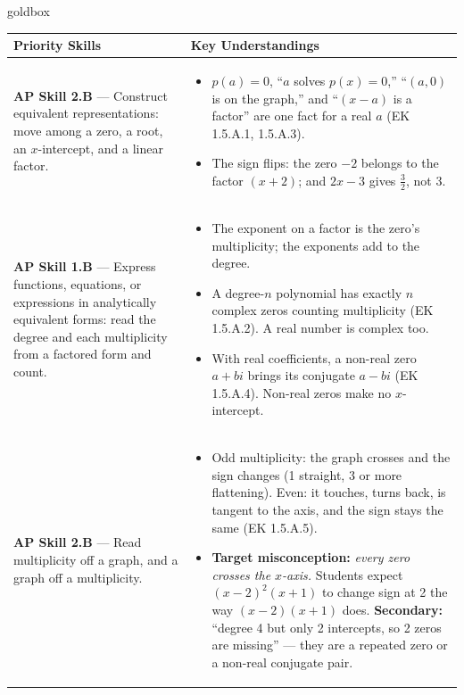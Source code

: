 \documentclass[10pt]{article}
\begin{document}
\renewcommand{\arraystretch}{1.6}
\begin{skillbox}{goldbox}
\begin{tabularx}{\linewidth}{@{}X X@{}}
\textbf{Priority Skills} &
\textbf{Key Understandings} \\
\midrule
\textbf{AP Skill 2.B} --- Construct equivalent representations: move among a zero, a root, an
$x$-intercept, and a linear factor. &
\begin{itemize}[leftmargin=1.2em,itemsep=2pt,topsep=0pt]
  \item $p(a) = 0$, ``$a$ solves $p(x) = 0$,'' ``$(a, 0)$ is on the graph,'' and ``$(x - a)$
        is a factor'' are one fact for a real $a$ (EK 1.5.A.1, 1.5.A.3).
  \item The sign flips: the zero $-2$ belongs to the factor $(x + 2)$; and $2x - 3$ gives
        $\tfrac{3}{2}$, not 3.
\end{itemize} \\
\textbf{AP Skill 1.B} --- Express functions, equations, or expressions in analytically
equivalent forms: read the degree and each multiplicity from a factored form and count. &
\begin{itemize}[leftmargin=1.2em,itemsep=2pt,topsep=0pt]
  \item The exponent on a factor is the zero's multiplicity; the exponents add to the degree.
  \item A degree-$n$ polynomial has exactly $n$ complex zeros counting multiplicity (EK
        1.5.A.2). A real number is complex too.
  \item With real coefficients, a non-real zero $a + bi$ brings its conjugate $a - bi$ (EK
        1.5.A.4). Non-real zeros make no $x$-intercept.
\end{itemize} \\
\textbf{AP Skill 2.B} --- Read multiplicity off a graph, and a graph off a multiplicity. &
\begin{itemize}[leftmargin=1.2em,itemsep=2pt,topsep=0pt]
  \item Odd multiplicity: the graph crosses and the sign changes (1 straight, 3 or more
        flattening). Even: it touches, turns back, is tangent to the axis, and the sign stays
        the same (EK 1.5.A.5).
  \item \textbf{Target misconception:} \textit{every zero crosses the $x$-axis.} Students
        expect $(x - 2)^2(x + 1)$ to change sign at 2 the way $(x - 2)(x + 1)$ does.
        \textbf{Secondary:} ``degree 4 but only 2 intercepts, so 2 zeros are missing'' --- they
        are a repeated zero or a non-real conjugate pair.
\end{itemize} \\
\end{tabularx}
\end{skillbox}
\end{document}
